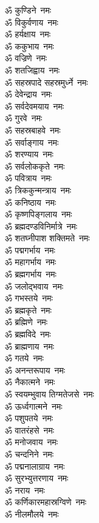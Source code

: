 \begin{multicols}{2}
\begin{flushleft}
ॐ कुण्डिने~नमः\\
ॐ विकुर्वणाय~नमः\\
ॐ हर्यक्षाय~नमः\\
ॐ ककुभाय~नमः\\
ॐ वज्रिणे~नमः\\
ॐ शतजिह्वाय~नमः\\
ॐ सहस्रपादे सहस्रमुर्ध्ने~नमः\\
ॐ देवेन्द्राय~नमः\hfill{}\\
ॐ सर्वदेवमयाय~नमः\\
ॐ गुरवे~नमः\\
ॐ सहस्रबाहवे~नमः\\
ॐ सर्वाङ्गाय~नमः\\
ॐ शरण्याय~नमः\\
ॐ सर्वलोककृते~नमः\\
ॐ पवित्राय~नमः\\
ॐ त्रिककुन्मन्त्राय~नमः\\
ॐ कनिष्ठाय~नमः\\
ॐ कृष्णपिङ्गलाय~नमः\hfill{}\\
ॐ ब्रह्मदण्डविनिर्मात्रे~नमः\\
ॐ शतघ्नीपाश शक्तिमते~नमः\\
ॐ पद्मगर्भाय~नमः\\
ॐ महागर्भाय~नमः\\
ॐ ब्रह्मगर्भाय~नमः\\
ॐ जलोद्भवाय~नमः\\
ॐ गभस्तये~नमः\\
ॐ ब्रह्मकृते~नमः\\
ॐ ब्रह्मिणे~नमः\\
ॐ ब्रह्मविदे~नमः\hfill{}\\
ॐ ब्राह्मणाय~नमः\\
ॐ गतये~नमः\\
ॐ अनन्तरूपाय~नमः\\
ॐ नैकात्मने~नमः\\
ॐ स्वयम्भुवाय तिग्मतेजसे~नमः\\
ॐ ऊर्ध्वगात्मने~नमः\\
ॐ पशुपतये~नमः\\
ॐ वातरंहसे~नमः\\
ॐ मनोजवाय~नमः\\
ॐ चन्दनिने~नमः\hfill{}\\
ॐ पद्मनालाग्राय~नमः\\
ॐ सुरभ्युत्तरणाय~नमः\\
ॐ नराय~नमः\\
ॐ कर्णिकारमहास्रग्विणे~नमः\\
ॐ नीलमौलये~नमः\\

\end{flushleft}
\end{multicols}
